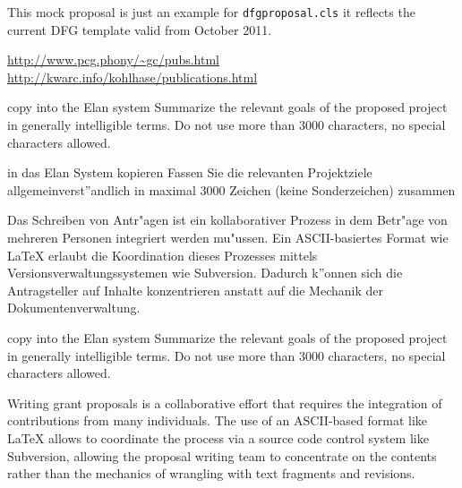 \documentclass[gitinfo,noworkareas,RAM\classoptions]{dfgproposal}
\begin{document}
\begin{center}\color{red}\huge
  This mock proposal is just an example for \texttt{dfgproposal.cls} it reflects the 
  current DFG template valid from October 2011.
\end{center}

\urldef{\gcpubs}\url{http://www.pcg.phony/~gc/pubs.html}
\urldef{\mikopubs}\url{http://kwarc.info/kohlhase/publications.html}
\begin{proposal}[PI=miko,
  pubspage=mikopubs,
  thema=Intelligentes Schreiben von Antr\"agen,
  acronym={iPoWr},
  acrolong={\underline{I}ntelligent} {\underline{P}r\underline{o}posal} {\underline{Wr}iting},
  title=\pn: \protect\pnlong,
  totalduration=3 years,
  since=1. Feb 2009,
  start=1. Feb. 2010,
  months=24,
  RM=36,RAM=36,
  discipline=Computer Science, 
  areas=Knowledge Management]


\begin{Summary}
  \begin{todo}{copy into the Elan system}
    Summarize the relevant goals of the proposed project in generally intelligible
    terms. Do not use more than 3000 characters, no special characters allowed.
  \end{todo}
\end{Summary}

\begin{Zusammenfassung}
  \begin{todo}{in das Elan System kopieren}
    Fassen Sie die relevanten Projektziele allgemeinverst''andlich in maximal 3000 Zeichen
    (keine Sonderzeichen) zusammen
  \end{todo}
  Das Schreiben von Antr"agen ist ein kollaborativer Prozess in dem Betr"age von mehreren
  Personen integriert werden mu"ussen. Ein ASCII-basiertes Format wie {\LaTeX} erlaubt die
  Koordination dieses Prozesses mittels Versionsverwaltungssystemen wie
  Subversion. Dadurch k''onnen sich die Antragsteller auf Inhalte konzentrieren anstatt
  auf die Mechanik der Dokumentenverwaltung.
\end{Zusammenfassung}

\begin{Summary}
  \begin{todo}{copy into the Elan system}
    Summarize the relevant goals of the proposed project in generally intelligible
    terms. Do not use more than 3000 characters, no special characters allowed.
  \end{todo}
  Writing grant proposals is a collaborative effort that requires the integration of
  contributions from many individuals. The use of an ASCII-based format like {\LaTeX}
  allows to coordinate the process via a source code control system like Subversion,
  allowing the proposal writing team to concentrate on the contents rather than the
  mechanics of wrangling with text fragments and revisions.
\end{Summary}


\end{proposal}
\end{document}
